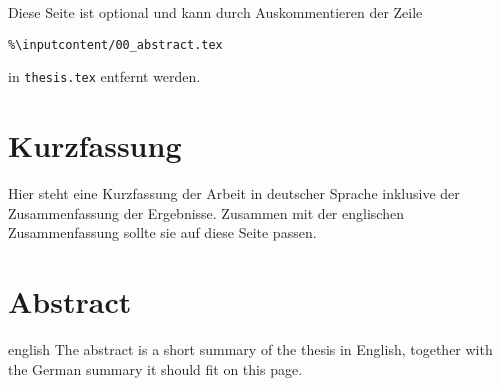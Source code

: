 \thispagestyle{plain}

Diese Seite ist optional und kann durch Auskommentieren der Zeile
\begin{center}
    \texttt{\%\textbackslash input\textbraceleft content/00\_abstract.tex\textbraceright}
\end{center}
in \texttt{thesis.tex} entfernt werden.

\section*{Kurzfassung}
Hier steht eine Kurzfassung der Arbeit in deutscher Sprache inklusive der Zusammenfassung der
Ergebnisse. 
Zusammen mit der englischen Zusammenfassung sollte sie auf diese Seite passen.

\section*{Abstract}
\begin{foreignlanguage}{english}
The abstract is a short summary of the thesis in English, together with the German summary it should fit on this page.
\end{foreignlanguage}
